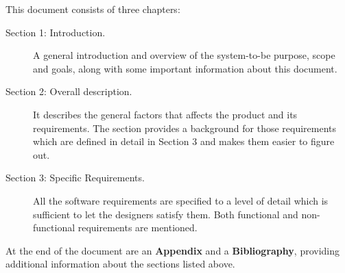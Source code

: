 This document consists of three chapters:

\begin{description}
\item[Section 1: Introduction.] A general introduction and overview of the system-to-be purpose, scope and goals, along with some important information about this document.
\item[Section 2: Overall description.] It describes the general factors that affects the product and its requirements. The section provides a background for those requirements which are defined in detail in Section 3 and makes them easier to figure out.
\item[Section 3: Specific Requirements.] All the software requirements are specified to a level of detail which is sufficient to let the designers satisfy them. Both functional and non-functional requirements are mentioned.
\end{description}
At the end of the document are an \textbf{Appendix} and a \textbf{Bibliography}, providing additional information about the sections listed above.